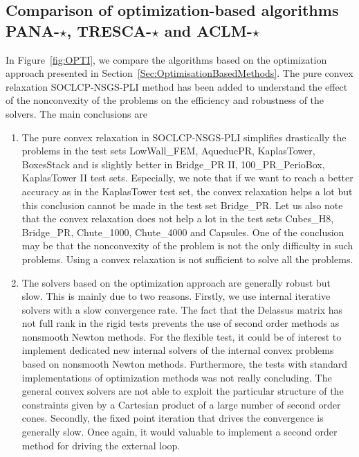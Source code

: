 \subsection{Comparison of optimization-based algorithms {\sf PANA-$\star$, TRESCA-$\star$ and ACLM-$\star$}}

In Figure~\ref{fig:OPTI}, we compare the algorithms based on the optimization approach presented in Section~\ref{Sec:OptimisationBasedMethods}. The pure convex relaxation {\sf SOCLCP-NSGS-PLI}  method has been added to understand the effect of the nonconvexity of the problems on the efficiency and robustness of the solvers. The main conclusions are
\begin{enumerate}
\item The pure convex relaxation in {\sf SOCLCP-NSGS-PLI}  simplifies drastically the problems in the test sets  LowWall\_FEM, AqueducPR, KaplasTower, BoxesStack  and is slightly better in Bridge\_PR II, 100\_PR\_PerioBox, KaplasTower II test sets. Especially, we note that if we want to reach a better accuracy as in the KaplasTower test set, the convex relaxation helps a lot but this conclusion cannot be made in the test set Bridge\_PR. Let us also note that  the convex relaxation does not help a lot in the test sets Cubes\_H8, Bridge\_PR, Chute\_1000, Chute\_4000 and Capsules. One of the conclusion may be that the nonconvexity of the problem is not the only difficulty in such problems. Using a convex relaxation is not sufficient to solve all the problems.
\item The solvers based on the optimization approach are generally robust but slow. This is mainly due to two reasons. Firstly,  we use internal iterative solvers with a slow convergence rate. The fact that  the Delassus matrix has not full rank in the rigid tests prevents the use of second order methods as nonsmooth Newton methods.  For the flexible test, it could be of interest to implement dedicated new internal solvers of the internal convex problems based on nonsmooth Newton methods. Furthermore, the tests with standard implementations of optimization methods was not really concluding. The general convex solvers are not  able to exploit the particular structure of the constraints given by a Cartesian product of a large number of second order cones. Secondly, the fixed point iteration that drives the convergence is generally slow. Once again, it would valuable to implement a second order method for driving the external loop.

\end{enumerate}
